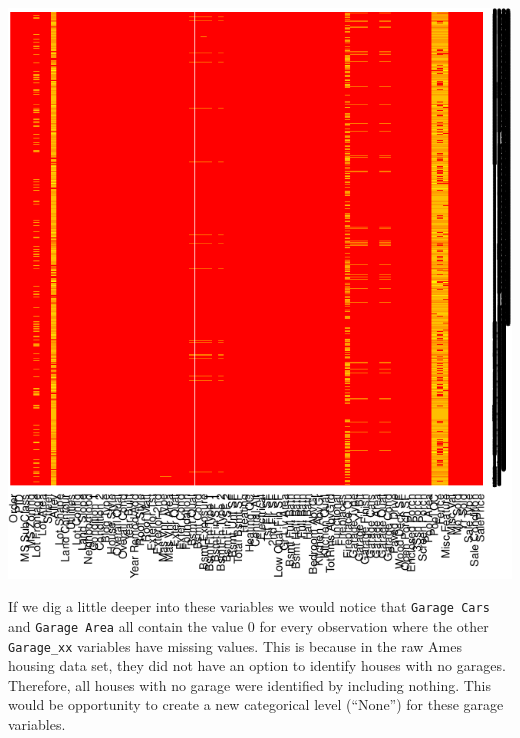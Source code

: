 \documentclass[]{article}
\begin{document}
\begin{center}\includegraphics{Chapter_3_-_Visualization_files/figure-latex/heatmap2-1} \end{center}

If we dig a little deeper into these variables we would notice that
\texttt{Garage\ Cars} and \texttt{Garage\ Area} all contain the value 0
for every observation where the other \texttt{Garage\_xx} variables have
missing values. This is because in the raw Ames housing data set, they
did not have an option to identify houses with no garages. Therefore,
all houses with no garage were identified by including nothing. This
would be opportunity to create a new categorical level (``None'') for
these garage variables.
\end{document}
